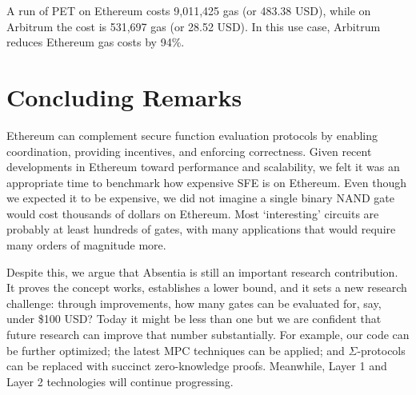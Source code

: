 A run of PET on Ethereum costs 9,011,425 gas (or 483.38 USD), while on Arbitrum the cost is 531,697 gas (or 28.52 USD). In this use case, Arbitrum reduces Ethereum gas costs by 94\%.  


\section{Concluding Remarks}

Ethereum can complement secure function evaluation protocols by enabling coordination, providing incentives, and enforcing correctness. Given recent developments in Ethereum toward performance and scalability, we felt it was an appropriate time to benchmark how expensive SFE is on Ethereum. Even though we expected it to be expensive, we did not imagine a single binary NAND gate would cost thousands of dollars on Ethereum. Most `interesting' circuits are probably at least hundreds of gates, with many applications that would require many orders of magnitude more.

Despite this, we argue that Absentia is still an important research contribution. It proves the concept works, establishes a  lower bound, and it sets a new research challenge: through improvements, how many gates can be evaluated for, say, under \$100 USD? Today it might be less than one but we are confident that future research can improve that number substantially. For example, our code can be further optimized; the latest MPC techniques can be applied; and $\Sigma$-protocols can be replaced with succinct zero-knowledge proofs. Meanwhile, Layer 1 and Layer 2 technologies will continue progressing.


